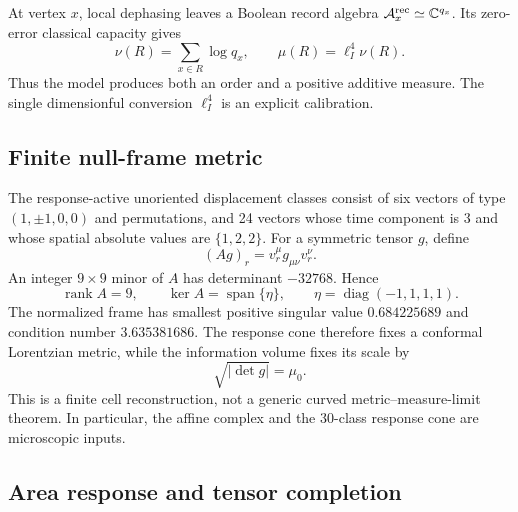 At vertex \(x\), local dephasing leaves a Boolean record algebra
\(\mathcal A_x^{\rm rec}\simeq\mathbb C^{q_x}\).  Its zero-error classical
capacity gives
\begin{equation}
 \nu(R)=\sum_{x\in R}\log q_x,\qquad
 \mu(R)=\ell_I^4\nu(R).
 \label{eq:affine-information-volume}
\end{equation}
Thus the model produces both an order and a positive additive measure.  The
single dimensionful conversion \(\ell_I^4\) is an explicit calibration.

\subsection{Finite null-frame metric}

The response-active unoriented displacement classes consist of six vectors
of type \((1,\pm1,0,0)\) and permutations, and 24 vectors whose time
component is \(3\) and whose spatial absolute values are
\(\{1,2,2\}\).  For a symmetric tensor \(g\), define
\begin{equation}
 (Ag)_r=v_r^\mu g_{\mu\nu}v_r^\nu .
 \label{eq:affine-design}
\end{equation}
An integer \(9\times9\) minor of \(A\) has determinant \(-32768\).  Hence
\begin{equation}
 \operatorname{rank}A=9,\qquad
 \ker A=\operatorname{span}\{\eta\},\qquad
 \eta=\operatorname{diag}(-1,1,1,1).
 \label{eq:affine-rank-nine}
\end{equation}
The normalized frame has smallest positive singular value \(0.684225689\)
and condition number \(3.635381686\).  The response cone therefore fixes a
conformal Lorentzian metric, while the information volume fixes its scale by
\begin{equation}
 \sqrt{|\det g|}=\mu_0 .
 \label{eq:affine-scale}
\end{equation}
This is a finite cell reconstruction, not a generic curved
metric--measure-limit theorem.  In particular, the affine complex and the
30-class response cone are microscopic inputs.

\subsection{Area response and tensor completion}

